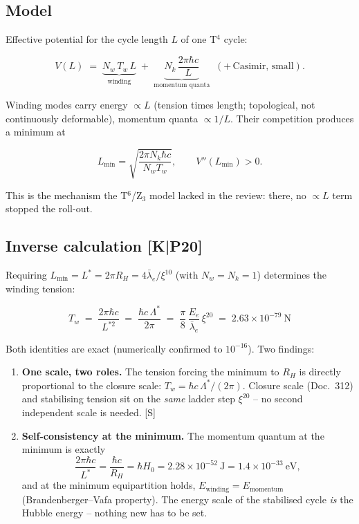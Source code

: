 \documentclass[11pt]{report}
\begin{document}
\subsection{Model}

Effective potential for the cycle length $L$ of one T$^4$ cycle:

\begin{equation}
  V(L) \;=\; \underbrace{N_w\,T_w\,L}_{\text{winding}}
  \;+\; \underbrace{N_k\,\frac{2\pi\hbar c}{L}}_{\text{momentum quanta}}
  \;\;(+\,\text{Casimir, small}).
  \label{eq:pot}
\end{equation}

Winding modes carry energy $\propto L$ (tension times length;
topological, not continuously deformable), momentum quanta
$\propto 1/L$. Their competition produces a minimum at

\begin{equation}
  L_{\min} = \sqrt{\frac{2\pi N_k \hbar c}{N_w T_w}},
  \qquad V''(L_{\min}) > 0.
\end{equation}

This is the mechanism the T$^6$/Z$_3$ model lacked in the review:
there, no $\propto L$ term stopped the roll-out.

\subsection{Inverse calculation [K|P20]}

Requiring $L_{\min} = L^{*} = 2\pi R_H = 4\bar\lambda_e/\xi^{10}$
(with $N_w = N_k = 1$) determines the winding tension:

\begin{equation}
  \boxed{\;T_w \;=\; \frac{2\pi\hbar c}{L^{*2}}
  \;=\; \frac{\hbar c\,\Lambda^{*}}{2\pi}
  \;=\; \frac{\pi}{8}\,\frac{E_e}{\bar\lambda_e}\,\xi^{20}
  \;=\; 2.63\times10^{-79}~\text{N}\;}
  \label{eq:tw}
\end{equation}

Both identities are exact (numerically confirmed to $10^{-16}$).
Two findings:

\begin{enumerate}
  \item \textbf{One scale, two roles.} The tension forcing the
        minimum to $R_H$ is directly proportional to the closure
        scale: $T_w = \hbar c\,\Lambda^{*}/(2\pi)$. Closure scale
        (Doc.~312) and stabilising tension sit on the \emph{same}
        ladder step $\xi^{20}$ -- no second independent scale is
        needed. [S]
  \item \textbf{Self-consistency at the minimum.} The momentum
        quantum at the minimum is exactly
        \[
          \frac{2\pi\hbar c}{L^{*}} = \frac{\hbar c}{R_H}
          = \hbar H_0 = 2.28\times10^{-52}~\text{J}
          = 1.4\times10^{-33}~\text{eV},
        \]
        and at the minimum equipartition holds,
        $E_\text{winding} = E_\text{momentum}$ (Brandenberger--Vafa
        property). The energy scale of the stabilised cycle
        \emph{is} the Hubble energy -- nothing new has to be set.
\end{enumerate}
\end{document}
